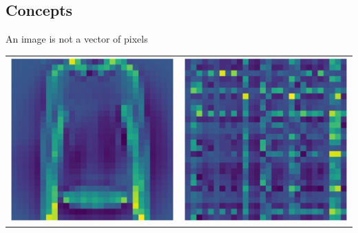 \documentclass[pressentation,10pt,aspectratio=169,xcolor=table, colorlinks=true]{beamer}
\begin{document}
\subsection{Concepts}
\begin{frame}{An image is not a vector of pixels}
  \begin{center}
    \begin{tabular}{cc}
      \includegraphics[width=0.35\linewidth]{figures/im.png} & \includegraphics[width=0.35\linewidth]{figures/im_sort.png}
    \end{tabular}
  \end{center}
\end{frame}
\end{document}
